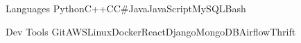 \begin{siderules}


\begin{cvskills}


\cvskill
{Languages} %
{Python{\enskip\cdotp\enskip}C++{\enskip\cdotp\enskip}C{\enskip\cdotp\enskip}C\#{\enskip\cdotp\enskip}Java{\enskip\cdotp\enskip}JavaScript{\enskip\cdotp\enskip}MySQL{\enskip\cdotp\enskip}Bash} %


\cvskill
{Dev Tools} 
{Git{\enskip\cdotp\enskip}AWS{\enskip\cdotp\enskip}Linux{\enskip\cdotp\enskip}Docker{\enskip\cdotp\enskip}React{\enskip\cdotp\enskip}Django{\enskip\cdotp\enskip}MongoDB{\enskip\cdotp\enskip}Airflow{\enskip\cdotp\enskip}Thrift} 





\end{cvskills}
\end{siderules}